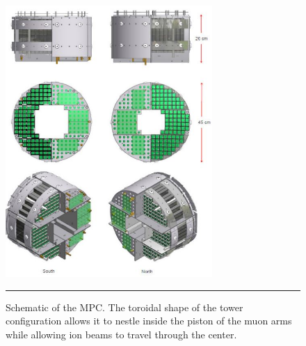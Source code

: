 \begin{figure}[h!]
  \centering
    \includegraphics[width=0.7\textwidth]{Figures/mpcschematic.JPG}
    \rule{35em}{0.5pt}
  \caption[Schematic of the MPC]{Schematic of the MPC. The toroidal shape of the tower configuration allows it to nestle inside the piston of the muon arms while allowing ion beams to travel through the center.}
  \label{fig:mpcschematic}
\end{figure}


